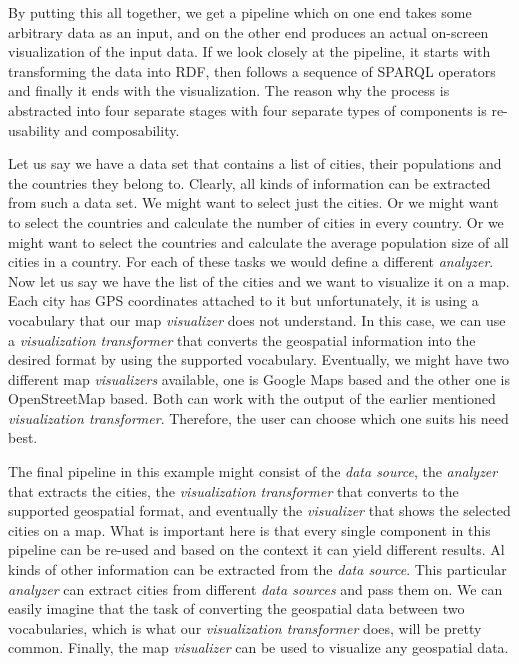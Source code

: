 By putting this all together, we get a pipeline which on one end takes some arbitrary data as an input, and on the other end produces an actual on-screen visualization of the input data. If we look closely at the pipeline, it starts with transforming the data into RDF, then follows a sequence of SPARQL operators and finally it ends with the visualization. The reason why the process is abstracted into four separate stages with four separate types of components is re-usability and composability. 

Let us say we have a data set that contains a list of cities,  their populations and the countries they belong to. Clearly, all kinds of information can be extracted from such a data set. We might want to select just the cities. Or we might want to select the countries and calculate the number of cities in every country. Or we might want to select the countries and calculate the average population size of all cities in a country. For each of these tasks we would define a different \emph{analyzer}. Now let us say we have the list of the cities and we want to visualize it on a map. Each city has GPS coordinates attached to it but unfortunately, it is using a vocabulary that our map \emph{visualizer} does not understand. In this case, we can use a \emph{visualization transformer} that converts the geospatial information into the desired format by using the supported vocabulary. Eventually, we might have two different map \emph{visualizers} available, one is Google Maps based and the other one is OpenStreetMap based. Both can work with the output of the earlier mentioned \emph{visualization transformer}. Therefore, the user can choose which one suits his need best.

The final pipeline in this example might consist of the \emph{data source}, the \emph{analyzer} that extracts the cities, the \emph{visualization transformer} that converts to the supported geospatial format, and eventually the \emph{visualizer} that shows the selected cities on a map. What is important here is that every single component in this pipeline can be re-used and based on the context it can yield different results. Al kinds of other information can be extracted from the \emph{data source}. This particular \emph{analyzer} can extract cities from different \emph{data sources} and pass them on. We can easily imagine that the task of converting the geospatial data between two vocabularies, which is what our \emph{visualization transformer} does, will be pretty common. Finally, the map \emph{visualizer} can be used to visualize any geospatial data.

